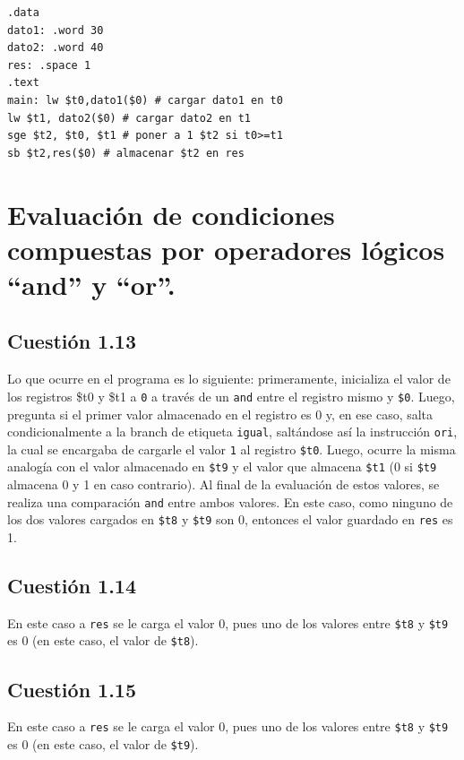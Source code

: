 \documentclass[11pt]{article}
\begin{document}
\begin{large}
\begin{flushleft}
\begin{listing}[h]
\begin{verbatim}
.data
dato1: .word 30
dato2: .word 40
res: .space 1
.text
main: lw $t0,dato1($0) # cargar dato1 en t0
lw $t1, dato2($0) # cargar dato2 en t1
sge $t2, $t0, $t1 # poner a 1 $t2 si t0>=t1
sb $t2,res($0) # almacenar $t2 en res
\end{verbatim}
\end{listing}

\section*{Evaluación de condiciones compuestas por operadores lógicos
``and'' y ``or''.}


\subsection*{Cuestión 1.13}
Lo que ocurre en el programa es lo siguiente: primeramente, inicializa el valor de los registros \$t0 y \$t1 a \texttt{0} a través de un \texttt{and} entre el registro mismo y \texttt{\$0}. Luego, pregunta si el primer valor almacenado en el registro es 0 y, en ese caso, salta condicionalmente a la branch de etiqueta \texttt{igual}, saltándose así la instrucción \texttt{ori}, la cual se encargaba de cargarle el valor \texttt{1} al registro \texttt{\$t0}. Luego, ocurre la misma analogía con el valor almacenado en \texttt{\$t9} y el valor que almacena \texttt{\$t1} (0 si \texttt{\$t9} almacena 0 y 1 en caso contrario). Al final de la evaluación de estos valores, se realiza una comparación \texttt{and} entre ambos valores. En este caso, como ninguno de los dos valores cargados en \texttt{\$t8} y \texttt{\$t9} son 0, entonces el valor guardado en \texttt{res} es 1.



\subsection*{Cuestión 1.14}
En este caso a \texttt{res} se le carga el valor 0, pues uno de los valores entre \texttt{\$t8} y \texttt{\$t9} es 0 (en este caso, el valor de \texttt{\$t8}).




\subsection*{Cuestión 1.15}
En este caso a \texttt{res} se le carga el valor 0, pues uno de los valores entre \texttt{\$t8} y \texttt{\$t9} es 0 (en este caso, el valor de \texttt{\$t9}).


\end{flushleft}
\end{large}
\end{document}
